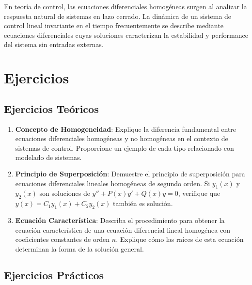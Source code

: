 \documentclass[12pt,a4paper]{article}
\begin{document}
En teoría de control, las ecuaciones diferenciales homogéneas surgen al analizar la respuesta natural de sistemas en lazo cerrado. La dinámica de un sistema de control lineal invariante en el tiempo frecuentemente se describe mediante ecuaciones diferenciales cuyas soluciones caracterizan la estabilidad y performance del sistema sin entradas externas.

\section{Ejercicios}

\subsection{Ejercicios Teóricos}

\begin{enumerate}
    \item \textbf{Concepto de Homogeneidad}: Explique la diferencia fundamental entre ecuaciones diferenciales homogéneas y no homogéneas en el contexto de sistemas de control. Proporcione un ejemplo de cada tipo relacionado con modelado de sistemas.
    
    \item \textbf{Principio de Superposición}: Demuestre el principio de superposición para ecuaciones diferenciales lineales homogéneas de segundo orden. Si $y_1(x)$ y $y_2(x)$ son soluciones de $y'' + P(x)y' + Q(x)y = 0$, verifique que $y(x) = C_1 y_1(x) + C_2 y_2(x)$ también es solución.
    
    \item \textbf{Ecuación Característica}: Describa el procedimiento para obtener la ecuación característica de una ecuación diferencial lineal homogénea con coeficientes constantes de orden $n$. Explique cómo las raíces de esta ecuación determinan la forma de la solución general.
\end{enumerate}

\subsection{Ejercicios Prácticos}
\end{document}
